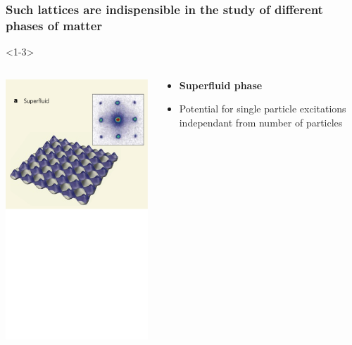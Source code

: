 \documentclass[aspectratio=169]{beamer}
\begin{document}
\begin{frame}
  \frametitle{Such lattices are indispensible in the study of different phases of matter}
  \begin{onlyenv}<1-3>
    \begin{columns}[T] %
      \begin{column}{.48\textwidth}
        \begin{center}
          \includegraphics[scale=0.2]{../img/SF.png}
        \end{center}
      \end{column}%
      \hfill%
      \begin{column}{.48\textwidth}
        \begin{itemize}
          \item<2-> \textbf{Superfluid phase}
          \item<3-> Potential for single particle excitations independant from number of particles 
        \end{itemize}
      \end{column}%

\end{columns}
\end{onlyenv}
\end{frame}
\end{document}
